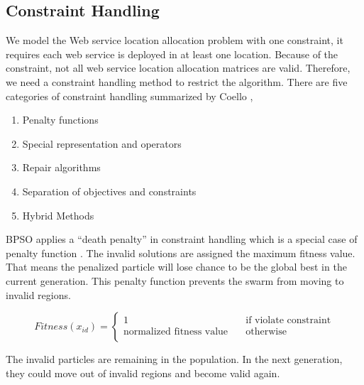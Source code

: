 \subsection{Constraint Handling}
We model the Web service location allocation problem with one constraint, it requires each web service is deployed in at least one location.
Because of the constraint, not all web service location allocation matrices are valid. Therefore, we need a constraint handling method to
restrict the algorithm.
\label{sec:constraint}
There are five categories of constraint handling summarized by Coello \cite{coello2002theoretical}, 
\begin{enumerate}
	\item Penalty functions
	\item Special representation and operators
	\item Repair algorithms
	\item Separation of objectives and constraints
	\item Hybrid Methods
\end{enumerate}
 
BPSO applies a ``death penalty'' in constraint handling which is a special case of penalty function \cite{coello2002theoretical}.
The invalid solutions are assigned the maximum fitness value. That means the penalized 
particle will lose chance to be the global best in the current generation. This penalty function prevents the swarm from moving to invalid regions.

\begin{equation}
\label{eq:death}
		Fitness(x_{id}) = 
		\begin{cases}
			1 & \quad \text{if violate constraint} \\
			\text{normalized fitness value} & \quad \text{otherwise} \\
		\end{cases}
\end{equation}


The invalid particles are remaining in the 
population. In the next generation, they could move out of invalid regions and
become valid again.






